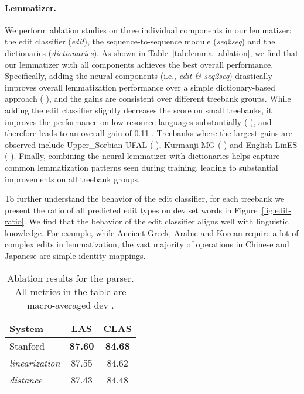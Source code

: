 \documentclass[11pt,a4paper]{article}
\newcommand{\fone}{}
\begin{document}
\paragraph{Lemmatizer.}
We perform ablation studies on three individual components in our lemmatizer: the edit classifier (\textit{edit}), the sequence-to-sequence module (\textit{seq2seq}) and the dictionaries (\textit{dictionaries}).
As shown in Table~\ref{tab:lemma_ablation}, we find that our lemmatizer with all components achieves the best overall performance.
Specifically, adding the neural components (i.e., \emph{edit \& seq2seq}) drastically improves overall lemmatization performance over a simple dictionary-based approach ( \fone), and the gains are consistent over different treebank groups.
While adding the edit classifier slightly decreases the \fone{} score on small treebanks, it improves the performance on low-resource languages substantially ( \fone), and therefore leads to an overall gain of 0.11 \fone.
Treebanks where the largest gains are observed include Upper\_Sorbian-UFAL ( \fone), Kurmanji-MG ( \fone) and English-LinES ( \fone).
Finally, combining the neural lemmatizer with dictionaries helps capture common lemmatization patterns seen during training, leading to substantial improvements on all treebank groups.

To further understand the behavior of the edit classifier, for each treebank we present the ratio of all predicted edit types on dev set words in Figure~\ref{fig:edit-ratio}. We find that the behavior of the edit classifier aligns well with linguistic knowledge. For example, while Ancient Greek, Arabic and Korean require a lot of complex edits in lemmatization, the vast majority of operations in Chinese and Japanese are simple identity mappings.



\begin{table}
\centering
\small
\begin{tabular}{lcc}
\toprule
System & LAS & CLAS\\
\midrule
Stanford & \textbf{87.60} & \textbf{84.68}\\
 \textit{linearization} & 87.55 & 84.62\\
 \textit{distance} & 87.43 & 84.48\\
\bottomrule
\end{tabular}
\caption{Ablation results for the parser. All metrics in the table are macro-averaged dev \fone{}.}
\label{tab:parser_ablation}
\end{table}
\end{document}
